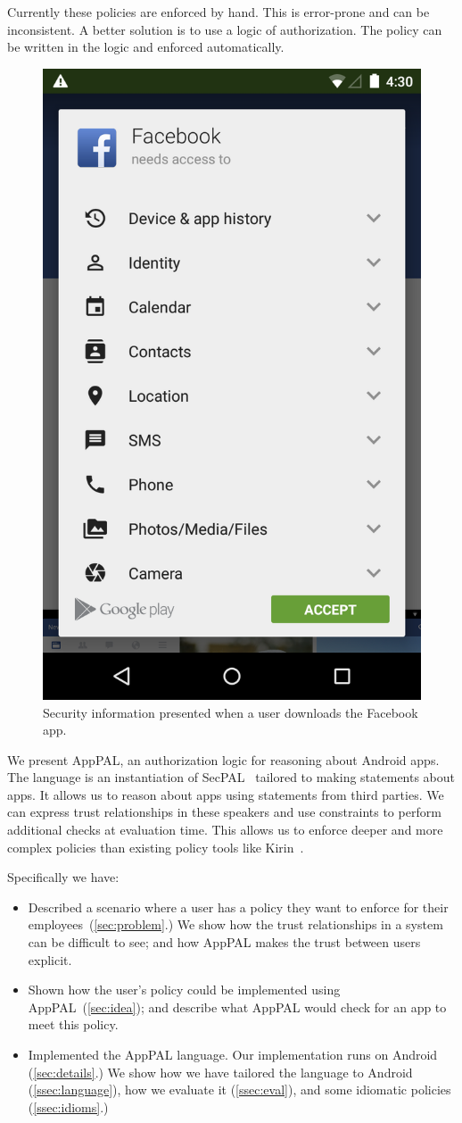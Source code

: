 \documentclass[a4paper]{scrartcl}
\newcommand{\comment}[1]{}%
\begin{document}
Currently these policies are enforced by hand.
This is error-prone and can be inconsistent.
A better solution is to use a logic of authorization.
The policy can be written in the logic and enforced automatically.

\begin{figure}
  \centering
  \includegraphics[width=0.3\linewidth]{figures/facebook.png}
  \caption{Security information presented when a user downloads the Facebook app.}
\label{fig:facebook}
\end{figure}

We present AppPAL, an authorization logic for reasoning about Android apps.
The language is an instantiation of SecPAL~\citep{Becker:2006vh} tailored to making statements about apps.
It allows us to reason about apps using statements from third parties.
We can express trust relationships in these speakers and use constraints to perform additional checks at evaluation time.
This allows us to enforce deeper and more complex policies than existing policy tools like Kirin~\citep{Enck:2009ko}.

Specifically we have:
\begin{itemize}
  \item 
    Described a scenario where a user has a policy they want to enforce for their employees~(\autoref{sec:problem}.) 
    We show how the trust relationships in a system can be difficult to see;
      and how AppPAL makes the trust between users explicit.
  \item 
    Shown how the user's policy could be implemented using AppPAL~(\autoref{sec:idea}); 
      and describe what AppPAL would check for an app to meet this policy.
    
  \item Implemented the AppPAL language.  
    Our implementation runs on Android (\autoref{sec:details}.)
    We show how we have tailored the language to Android (\autoref{ssec:language}),
      how we evaluate it (\autoref{ssec:eval}),
      and some idiomatic policies (\autoref{ssec:idioms}.)
\end{itemize}
\end{document}

